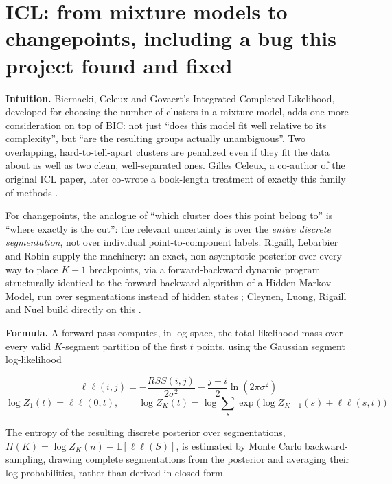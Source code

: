 \documentclass[11pt]{article}
\begin{document}
\section{ICL: from mixture models to changepoints, including a bug this project found and fixed}

\textbf{Intuition.} Biernacki, Celeux and Govaert's Integrated Completed
Likelihood, developed for choosing the number of clusters in a mixture
model, adds one more consideration on top of BIC: not just ``does this
model fit well relative to its complexity'', but ``are the resulting
groups actually unambiguous''. Two overlapping, hard-to-tell-apart clusters
are penalized even if they fit the data about as well as two clean,
well-separated ones. Gilles Celeux, a co-author of the original ICL paper,
later co-wrote a book-length treatment of exactly this family of methods
\citep{bouveyron2021mbc}.

For changepoints, the analogue of ``which cluster does this point belong
to'' is ``where exactly is the cut'': the relevant uncertainty is over the
\emph{entire discrete segmentation}, not over individual point-to-component
labels. Rigaill, Lebarbier and Robin supply the machinery: an exact,
non-asymptotic posterior over every way to place $K-1$ breakpoints, via a
forward-backward dynamic program structurally identical to the
forward-backward algorithm of a Hidden Markov Model, run over segmentations
instead of hidden states \citeyearpar{rigaill2012}; Cleynen, Luong, Rigaill
and Nuel build directly on this \citeyearpar{cleynen2013}.

\textbf{Formula.} A forward pass computes, in log space, the total
likelihood mass over every valid $K$-segment partition of the first $t$
points, using the Gaussian segment log-likelihood

\begin{equation}
\ell\ell(i, j) = -\frac{RSS(i, j)}{2\sigma^2} - \frac{j - i}{2} \ln(2\pi\sigma^2)
\end{equation}
\begin{equation}
\log Z_1(t) = \ell\ell(0, t), \qquad \log Z_K(t) = \log \sum_{s} \exp\!\Big( \log Z_{K-1}(s) + \ell\ell(s, t) \Big)
\end{equation}

The entropy of the resulting discrete posterior over segmentations, $H(K) =
\log Z_K(n) - \mathbb{E}[\ell\ell(S)]$, is estimated by Monte Carlo
backward-sampling, drawing complete segmentations from the posterior and
averaging their log-probabilities, rather than derived in closed form.
\end{document}
